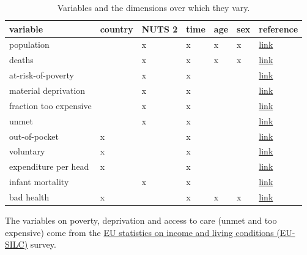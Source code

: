 \documentclass[a4paper,12pt]{article}
\begin{document}
\begin{table}[htbp]
\caption{\label{tab:VariablesDimensions}Variables and the dimensions over which they vary.}
\centering
\begin{tabular}{lllllll}
variable & country & NUTS 2 & time & age & sex & reference\\[0pt]
\hline
population &  & x & x & x & x & \href{https://ec.europa.eu/eurostat/databrowser/view/DEMO\_R\_D2JAN/default/table?lang=en\&category=demo.demopreg}{link}\\[0pt]
deaths &  & x & x & x & x & \href{https://ec.europa.eu/eurostat/databrowser/view/DEMO\_R\_MAGEC/default/table?lang=en\&category=demo.demomreg}{link}\\[0pt]
at-risk-of-poverty &  & x & x &  &  & \href{https://ec.europa.eu/eurostat/databrowser/view/tgs00103/default/table?lang=en}{link}\\[0pt]
material deprivation &  & x & x &  &  & \href{https://ec.europa.eu/eurostat/databrowser/view/tgs00104/default/table?lang=en}{link}\\[0pt]
fraction too expensive &  & x & x &  &  & \href{https://ec.europa.eu/eurostat/databrowser/view/hlth\_silc\_08\_r/default/table?lang=en}{link}\\[0pt]
unmet &  & x & x &  &  & \href{https://ec.europa.eu/eurostat/databrowser/view/hlth\_silc\_08\_r/default/table?lang=en}{link}\\[0pt]
out-of-pocket & x &  & x &  &  & \href{https://ec.europa.eu/eurostat/databrowser/view/hlth\_sha11\_hf/default/table?lang=en}{link}\\[0pt]
voluntary & x &  & x &  &  & \href{https://ec.europa.eu/eurostat/databrowser/view/hlth\_sha11\_hf/default/table?lang=en}{link}\\[0pt]
expenditure per head & x &  & x &  &  & \href{https://ec.europa.eu/eurostat/databrowser/view/hlth\_sha11\_hc/default/table?lang=en}{link}\\[0pt]
infant mortality &  & x & x &  &  & \href{https://ec.europa.eu/eurostat/databrowser/view/DEMO\_R\_MINFIND/default/table?lang=en\&category=demo.demomreg}{link}\\[0pt]
bad health & x &  & x & x & x & \href{https://ec.europa.eu/eurostat/databrowser/view/hlth\_silc\_02/default/table?lang=en}{link}\\[0pt]
\end{tabular}
\end{table}



The variables on poverty, deprivation and access to care (unmet and too expensive) come from the \href{https://ec.europa.eu/eurostat/statistics-explained/index.php?title=EU\_statistics\_on\_income\_and\_living\_conditions\_(EU-SILC)\_methodology}{EU statistics on income and living conditions (EU-SILC)} survey.
\end{document}
